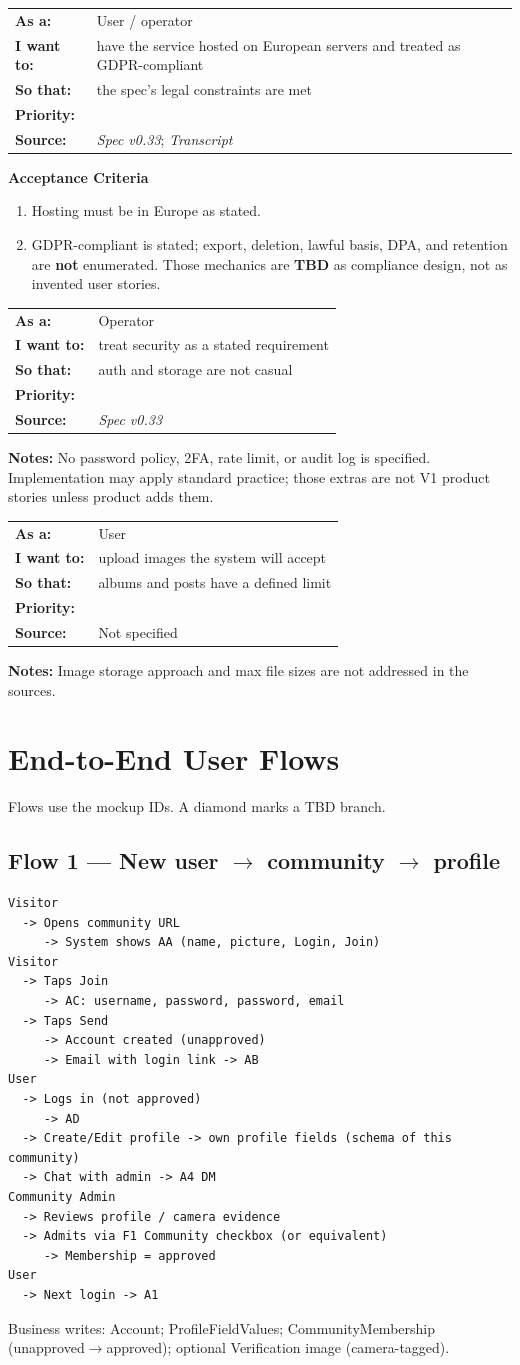 \documentclass[11pt,a4paper]{article}
\makeatletter
\newcommand{\priPzero}{\colorbox{p0}{\makebox[4.6em]{\textcolor{white}{\scriptsize\bfseries P0 V1}}}}
\newcommand{\priTBD}{\colorbox{tbd}{\makebox[4.6em]{\textcolor{white}{\scriptsize\bfseries TBD}}}}
\newcommand{\srcSpec}{\textit{Spec v0.33}}
\newcommand{\srcTx}{\textit{Transcript}}
\newenvironment{story}[1]{%
  \Needspace{10\baselineskip}%
  \vspace{0.7em}%
  \noindent
  \colorbox{navy}{\makebox[\dimexpr\textwidth-2\fboxsep\relax][l]{\textcolor{white}{\bfseries\ #1}}}%
  \par\vspace{0.35em}%
}{\par\vspace{0.55em}}
\newcommand{\storymeta}[5]{%
  \noindent
  \begin{tabularx}{\textwidth}{@{}>{\bfseries}l X@{}}
    As a: & #1 \\
    I want to: & #2 \\
    So that: & #3 \\
    Priority: & #4 \\
    Source: & #5 \\
  \end{tabularx}
  \par\vspace{0.3em}
}
\newcommand{\achead}{\noindent\textbf{Acceptance Criteria}\par}
\newcommand{\notes}[1]{\noindent\textbf{Notes:} #1\par}
\makeatother
\begin{document}
\begin{story}{SEC-006 --- European servers and GDPR}
\storymeta{User / operator}{have the service hosted on European servers and treated as GDPR-compliant}{the spec's legal constraints are met}{\priPzero}{\srcSpec; \srcTx}
\achead
\begin{enumerate}
  \item Hosting must be in Europe as stated.
  \item GDPR-compliant is stated; export, deletion, lawful basis, DPA, and retention are \textbf{not} enumerated. Those mechanics are \textbf{TBD} as compliance design, not as invented user stories.
\end{enumerate}
\end{story}

\begin{story}{SEC-007 --- High security without a mandated mechanism}
\storymeta{Operator}{treat security as a stated requirement}{auth and storage are not casual}{\priPzero}{\srcSpec}
\notes{No password policy, 2FA, rate limit, or audit log is specified. Implementation may apply standard practice; those extras are not V1 product stories unless product adds them.}
\end{story}

\begin{story}{SEC-008 --- Image file constraints}
\storymeta{User}{upload images the system will accept}{albums and posts have a defined limit}{\priTBD}{Not specified}
\notes{Image storage approach and max file sizes are not addressed in the sources.}
\end{story}

\newpage
\section{End-to-End User Flows}
Flows use the mockup IDs. A diamond marks a TBD branch.

\subsection{Flow 1 --- New user $\rightarrow$ community $\rightarrow$ profile}
\begin{verbatim}
Visitor
  -> Opens community URL
     -> System shows AA (name, picture, Login, Join)
Visitor
  -> Taps Join
     -> AC: username, password, password, email
  -> Taps Send
     -> Account created (unapproved)
     -> Email with login link -> AB
User
  -> Logs in (not approved)
     -> AD
  -> Create/Edit profile -> own profile fields (schema of this community)
  -> Chat with admin -> A4 DM
Community Admin
  -> Reviews profile / camera evidence
  -> Admits via F1 Community checkbox (or equivalent)
     -> Membership = approved
User
  -> Next login -> A1
\end{verbatim}
Business writes: Account; ProfileFieldValues; CommunityMembership (unapproved$\rightarrow$approved); optional Verification image (camera-tagged).
\end{document}

